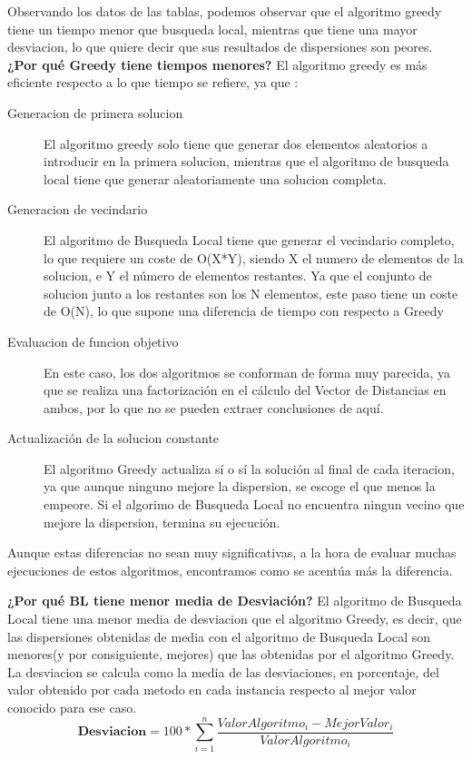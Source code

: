 \documentclass{article}
\begin{document}
\vspace{10mm}
Observando los datos de las tablas, podemos observar que el algoritmo greedy tiene un 
tiempo menor que busqueda local, mientras que tiene una mayor desviacion, lo que quiere decir 
que sus resultados de dispersiones son peores.
\vspace{10mm}
\newline \textbf{¿Por qué Greedy tiene tiempos menores?}
\newline El algoritmo greedy es más eficiente respecto a lo que tiempo se refiere, 
ya que :
\begin{description}
  \item[Generacion de primera solucion]
  El algoritmo greedy solo tiene que generar dos elementos aleatorios a introducir 
  en la primera solucion, mientras que el algoritmo de busqueda local tiene que 
  generar aleatoriamente una solucion completa.
  \item[Generacion de vecindario]
  El algoritmo de Busqueda Local tiene que generar el vecindario completo, lo que requiere un 
  coste de O(X*Y), siendo X el numero de elementos de la solucion, e Y el número de elementos restantes.
  Ya que el conjunto de solucion junto a los restantes son los N elementos, este paso tiene un coste 
  de O(N), lo que supone una diferencia de tiempo con respecto a Greedy
  \item[Evaluacion de funcion objetivo]
  En este caso, los dos algoritmos se conforman de forma muy parecida, ya que se realiza 
  una factorización en el cálculo del Vector de Distancias en ambos, por lo que no se pueden 
  extraer conclusiones de aquí.
  \item[Actualización de la solucion constante]
  El algoritmo Greedy actualiza sí o sí la solución al final de cada iteracion, ya que 
  aunque ninguno mejore la dispersion, se escoge el que menos la empeore. Si el algorimo de 
  Busqueda Local no encuentra ningun vecino que mejore la dispersion, termina su ejecución.
\end{description}
Aunque estas diferencias no sean muy significativas, a la hora de evaluar muchas ejecuciones 
de estos algoritmos, encontramos como se acentúa más la diferencia.
\vspace{5mm}

\textbf{¿Por qué BL tiene menor media de Desviación?}
\newline El algoritmo de Busqueda Local tiene una menor media de desviacion que el algoritmo 
Greedy, es decir, que las dispersiones obtenidas de media con el algoritmo de Busqueda Local son 
menores(y por consiguiente, mejores) que las obtenidas por el algoritmo Greedy.
La desviacion se calcula como la media de las desviaciones, en porcentaje, del valor obtenido 
por cada metodo en cada instancia respecto al mejor valor conocido para ese caso.
\vspace{10mm}
\begin{equation}
  \textbf{Desviacion} = 
  100*\sum_{i=1}^n
  \frac{ValorAlgoritmo_i - MejorValor_i}{ValorAlgoritmo_i}
\end{equation}
\end{document}
